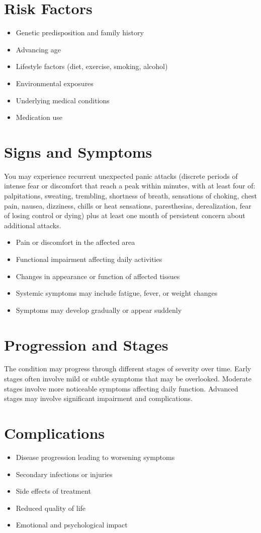\section{Risk Factors}
\begin{itemize}[noitemsep]
  \item Genetic predisposition and family history
  \item Advancing age
  \item Lifestyle factors (diet, exercise, smoking, alcohol)
  \item Environmental exposures
  \item Underlying medical conditions
  \item Medication use
\end{itemize}
\section{Signs and Symptoms}
You may experience recurrent unexpected panic attacks (discrete periods of intense fear or discomfort that reach a peak within minutes, with at least four of: palpitations, sweating, trembling, shortness of breath, sensations of choking, chest pain, nausea, dizziness, chills or heat sensations, paresthesias, derealization, fear of losing control or dying) plus at least one month of persistent concern about additional attacks.

\begin{itemize}[noitemsep]
  \item Pain or discomfort in the affected area
  \item Functional impairment affecting daily activities
  \item Changes in appearance or function of affected tissues
  \item Systemic symptoms may include fatigue, fever, or weight changes
  \item Symptoms may develop gradually or appear suddenly
\end{itemize}
\section{Progression and Stages}
The condition may progress through different stages of severity over time. Early stages often involve mild or subtle symptoms that may be overlooked. Moderate stages involve more noticeable symptoms affecting daily function. Advanced stages may involve significant impairment and complications.
\section{Complications}
\begin{itemize}[noitemsep]
  \item Disease progression leading to worsening symptoms
  \item Secondary infections or injuries
  \item Side effects of treatment
  \item Reduced quality of life
  \item Emotional and psychological impact
\end{itemize}
